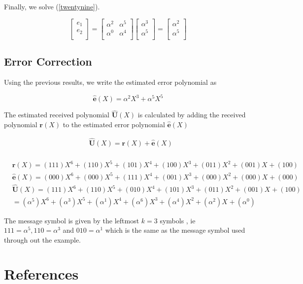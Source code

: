 \documentclass[fontsize=12pt]{article}
\begin{document}
Finally, we solve (\ref{twentynine}).

\begin{equation}
\begin{bmatrix}
    e_1       \\
    e_2       \\
\end{bmatrix}
=
\begin{bmatrix}
 \alpha^2       & \alpha^5 \\
    \alpha^0      &  \alpha^4 \\
\end{bmatrix}
\begin{bmatrix}
 \alpha^3       \\
  \alpha^5     \\
    \end{bmatrix}
=
\begin{bmatrix}
    \alpha^2       \\
    \alpha^5     \\
\end{bmatrix}
\end{equation}

\subsection{Error Correction}
Using the previous results, we write the estimated error polynomial as

\begin{equation}
\hat{\mathbf{e}}(X)=\alpha^2X^3 + \alpha^5X^5
\end{equation}

The estimated received polynomial $\hat{\mathbf{U}}(X)$ is calculated by adding the received polynomial $\mathbf{r}(X)$ to the estimated error polynomial $\hat{\mathbf{e}}(X)$ 

\begin{equation}
\begin{split}
&\hat{\mathbf{U}}(X) = {\mathbf{r}}(X)+\hat{\mathbf{e}}(X)\\
\end{split}
\end{equation}

\begin{equation}
\begin{split}
&{\mathbf{r}}(X) = (111)X^6 + (110)X^5 +(101)X^4 +(100)X^3 +(011)X^2 +(001)X^{} +(100)\\
&\hat{\mathbf{e}}(X) = (000)X^6 + (000)X^5 +(111)X^4 +(001)X^3 +(000)X^2 +(000)X^{} +(000)\\
&\hat{\mathbf{U}}(X) = (111)X^6 + (110)X^5 +(010)X^4 +(101)X^3 +(011)X^2 +(001)X^{} +(100)\\
&=(\alpha^5)X^6 + (\alpha^3)X^5 +(\alpha^1)X^4 +(\alpha^6)X^3 +(\alpha^4)X^2 +(\alpha^2)X^{} +(\alpha^0)
\end{split}
\end{equation}

The message symbol is given by the leftmost $k=3$ symbols , ie $111=\alpha^5, 110 = \alpha^3$ and $010=\alpha^1$ which is the same as the message symbol used through out the example.
\section{References}





 
\end{document}
